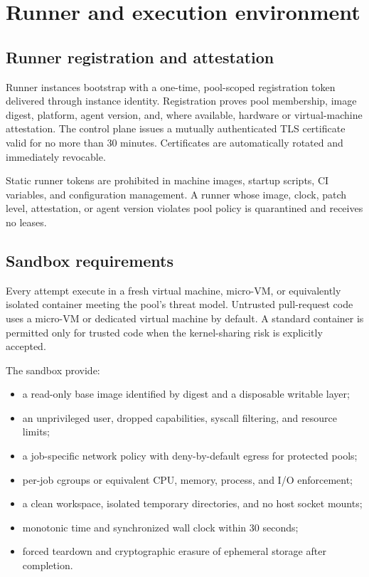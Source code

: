 \section{Runner and execution environment}

\subsection{Runner registration and attestation}

Runner instances bootstrap with a one-time, pool-scoped registration token delivered
through instance identity. Registration proves pool membership, image digest, platform,
agent version, and, where available, hardware or virtual-machine attestation. The
control plane issues a mutually authenticated TLS certificate valid for no more than
30 minutes. Certificates are automatically rotated and immediately revocable.

Static runner tokens are prohibited in machine images, startup scripts, CI variables,
and configuration management. A runner whose image, clock, patch level, attestation,
or agent version violates pool policy is quarantined and receives no leases.

\subsection{Sandbox requirements}

Every attempt \must execute in a fresh virtual machine, micro-VM, or equivalently
isolated container meeting the pool's threat model. Untrusted pull-request code uses a
micro-VM or dedicated virtual machine by default. A standard container is permitted
only for trusted code when the kernel-sharing risk is explicitly accepted.

The sandbox \must provide:

\begin{itemize}
  \item a read-only base image identified by digest and a disposable writable layer;
  \item an unprivileged user, dropped capabilities, syscall filtering, and resource limits;
  \item a job-specific network policy with deny-by-default egress for protected pools;
  \item per-job cgroups or equivalent CPU, memory, process, and I/O enforcement;
  \item a clean workspace, isolated temporary directories, and no host socket mounts;
  \item monotonic time and synchronized wall clock within 30 seconds;
  \item forced teardown and cryptographic erasure of ephemeral storage after completion.
\end{itemize}


